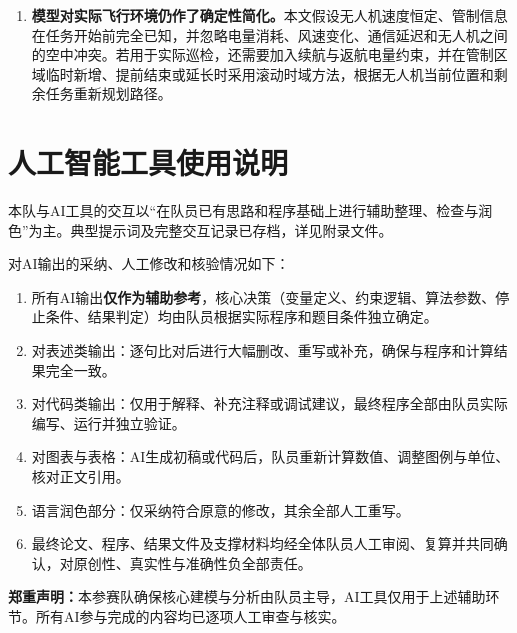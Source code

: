 \documentclass[UTF8,a4paper,12pt]{ctexart}
\numberwithin{equation}{section}
\numberwithin{equation}{section}
\begin{document}
\begin{enumerate}[label=（\arabic*）]
  \item \textbf{模型对实际飞行环境仍作了确定性简化。}本文假设无人机速度恒定、管制信息在任务开始前完全已知，并忽略电量消耗、风速变化、通信延迟和无人机之间的空中冲突。若用于实际巡检，还需要加入续航与返航电量约束，并在管制区域临时新增、提前结束或延长时采用滚动时域方法，根据无人机当前位置和剩余任务重新规划路径\cite{adamo2024}。
\end{enumerate}

\clearpage

\nocite{*}





\clearpage
\section*{人工智能工具使用说明}

本队与AI工具的交互以“在队员已有思路和程序基础上进行辅助整理、检查与润色”为主。典型提示词及完整交互记录已存档，详见附录文件。

\noindent 对AI输出的采纳、人工修改和核验情况如下：

\begin{enumerate}[label=\arabic*.]
  \item 所有AI输出\textbf{仅作为辅助参考}，核心决策（变量定义、约束逻辑、算法参数、停止条件、结果判定）均由队员根据实际程序和题目条件独立确定。
  \item 对表述类输出：逐句比对后进行大幅删改、重写或补充，确保与程序和计算结果完全一致。
  \item 对代码类输出：仅用于解释、补充注释或调试建议，最终程序全部由队员实际编写、运行并独立验证。
  \item 对图表与表格：AI生成初稿或代码后，队员重新计算数值、调整图例与单位、核对正文引用。
  \item 语言润色部分：仅采纳符合原意的修改，其余全部人工重写。
  \item 最终论文、程序、结果文件及支撑材料均经全体队员人工审阅、复算并共同确认，对原创性、真实性与准确性负全部责任。
\end{enumerate}

\noindent\textbf{郑重声明：}本参赛队确保核心建模与分析由队员主导，AI工具仅用于上述辅助环节。所有AI参与完成的内容均已逐项人工审查与核实。
\end{document}

